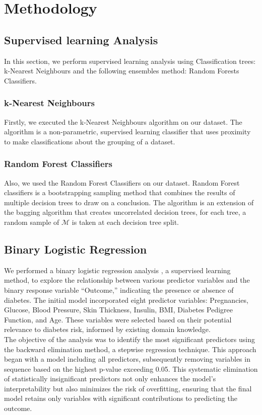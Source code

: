 \documentclass[12pt]{article}
\begin{document}
\section{Methodology}
\subsection{Supervised learning Analysis} 
 In this section, we perform supervised learning analysis using Classification trees: k-Nearest Neighbours and the following ensembles method: Random Forests Classifiers.\cite{zhou2012ensemble}
 
 \subsubsection{k-Nearest Neighbours}

 Firstly, we executed the k-Nearest Neighbours algorithm \cite{peterson2009k} on our dataset. The algorithm is a non-parametric, supervised learning classifier that uses proximity to make classifications about the grouping of a dataset.

 \subsubsection{Random Forest Classifiers}
 
 Also, we used the Random Forest Classifiers \cite{zhou2012ensemble} on our dataset. Random Forest classifiers is a bootstrapping sampling method that combines the results of multiple decision trees to draw on a conclusion. The algorithm \cite{Lecture16} is an extension of the bagging algorithm \cite{Lecture16} that creates uncorrelated decision trees, for each tree, a random sample of $\mathcal{M}$ is taken at each decision tree split.

\subsection{Binary Logistic Regression}
We performed a binary logistic regression analysis \cite{faraway2016extending}, a supervised learning method, to explore the relationship between various predictor variables and the binary response variable “Outcome,” indicating the presence or absence of diabetes. The initial model incorporated eight predictor variables: Pregnancies, Glucose, Blood Pressure, Skin Thickness, Insulin, BMI, Diabetes Pedigree Function, and Age. These variables were selected based on their potential relevance to diabetes risk, informed by existing domain knowledge.\\
\setlength{\parindent}{0pt}
The objective of the analysis was to identify the most significant predictors using the backward elimination method, a stepwise regression technique. This approach began with a model including all predictors, subsequently removing variables in sequence based on the highest p-value exceeding 0.05. This systematic elimination of statistically insignificant predictors not only enhances the model’s interpretability but also minimizes the risk of overfitting, ensuring that the final model retains only variables with significant contributions to predicting the outcome.
\end{document}
